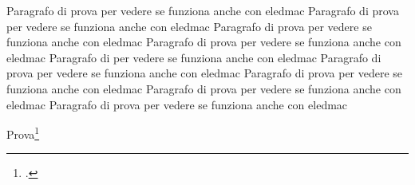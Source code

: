 \documentclass{book}
\begin{document}
\beginnumbering
\pstart
Paragrafo di prova per vedere se funziona anche con eledmac Paragrafo di prova per vedere se funziona anche con eledmac Paragrafo di prova per vedere se funziona anche con eledmac
Paragrafo di prova per vedere se funziona anche con eledmac
Paragrafo di  per vedere se funziona anche con eledmac
Paragrafo di prova per vedere se funziona anche con eledmac
Paragrafo di prova per vedere se funziona anche con eledmac
Paragrafo di prova per vedere se funziona anche con eledmac
Paragrafo di prova per vedere se funziona anche con eledmac
\pend
\endnumbering

Prova\footcite{bembo:donnini}


\printbibliography
\printindex
\end{document}
